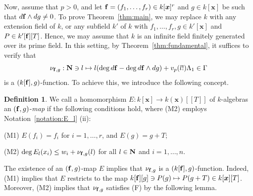 \documentclass{amsart}
\theoremstyle{plain}
\theoremstyle{definition}
\newtheorem{definition}[thm]{Definition}
\newcommand{\nd}{\noindent}
\newcommand{\N}{{\bf N}}
\newcommand{\x}{{\boldsymbol x}}
\newcommand{\ff}{{\bf f}}
\newcommand{\kx}{k[\x]}
\newcommand{\kxr}{k(\x)}
\newcommand{\degw  }{\deg}
\begin{document}
Now, 
assume that $p>0$, 
and let $\ff =(f_1,\ldots ,f_r)\in \kx ^r$ and $g\in \kx $ 
be such that $d\ff \wedge dg\ne 0$. 
To prove Theorem~\ref{thm:main}, 
we may replace $k$ with 
any extension field of $k$, or 
any subfield $k'$ of $k$ with 
$f_1,\ldots ,f_r,g\in k'[\x ]$ and $P\in k'[\ff ][T]$. 
Hence, 
we may assume that $k$ is an infinite field 
finitely generated over its prime field. 
In this setting, 
by Theorem~\ref{thm:fundamental}, 
it suffices to verify that 
\begin{equation}\label{eq:nu_{f,g}}
\nu _{\ff ,g}:\N \ni l\mapsto 
l(\degw d\ff -\degw d\ff \wedge dg)+v_p(l!)\Lambda _1
\in \Gamma 
\end{equation}
is a $(k[\ff],g)$-function. 
To achieve this, 
we introduce the following concept. 



\begin{definition}\label{def:(f,g)-map}\rm 
We call a homomorphism $E:\kx \to \kxr [[T]]$ of $k$-algebras 
an $(\ff ,g)$-{\it map} if the following conditions hold, 
where (M2) employs Notation~\ref{notation:E_l} (ii): 


\nd (M1) $E(f_i)=f_i$ for $i=1,\ldots ,r$, 
and $E(g)=g+T$; 


\nd (M2) 
$\degw E_l(x_i)\le w_i+\nu _{\ff ,g}(l)$ 
for all $l\in \N $ and $i=1,\ldots ,n$. 
\end{definition}



The existence of an $(\ff ,g)$-map $E$ 
implies that 
$\nu _{\ff ,g}$ 
is a $(k[\ff],g)$-function. 
Indeed, (M1) implies that $E$ restricts to the map 
$k[\ff ][g]\ni P(g)\mapsto P(g+T)\in \kx [T]$. 
Moreover, 
(M2) implies that 
$\nu _{\ff ,g}$ satisfies (F) by the following lemma. 
\end{document}
